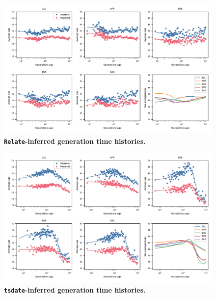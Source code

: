 \documentclass[]{article}
\newcommand{\tsdate}{\texttt{tsdate}\xspace}
\newcommand{\relate}{\texttt{Relate}\xspace}
\begin{document}
\begin{figure}[ht!]
    \centering
    \includegraphics[width=\textwidth]{../plots/inferred_generation_times.DM.relate.max_age.10000.pdf}
    \caption{
        \textbf{\relate-inferred generation time histories.}
    }
    \label{fig:relate-gen-times}
\end{figure}


\begin{figure}[ht!]
    \centering
    \includegraphics[width=\textwidth]{../plots/inferred_generation_times.DM.tsdate.max_age.10000.pdf}
    \caption{
        \textbf{\tsdate-inferred generation time histories.}
    }
    \label{fig:tsdate-gen-times}
\end{figure}
\end{document}
